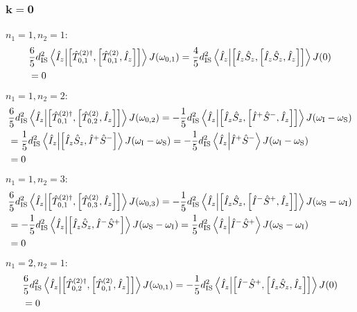 \begin{appendixtext}
\subsubsection{$\mathbf{k = 0}$}
$n_1 = 1, n_2 = 1$:
\begin{align*}
&\frac{6}{5} d_{\text{IS}}^2 \bra{\hat{I}_z} \ket{\comm{\hat{T}_{0, 1}^{(2) \dagger}}{\comm{\hat{T}_{0,1}^{(2)}}{\hat{I}_z}}} J(\omega_{0,1}) = \frac{4}{5} d_{\text{IS}}^2 \bra{\hat{I}_z} \ket{\comm{\hat{I}_z \hat{S}_z}{\comm{\hat{I}_z \hat{S}_z}{\hat{I}_z}}} J(0) \\
&= 0
\end{align*}
$n_1 = 1, n_2 = 2$:
\begin{align*}
&\frac{6}{5} d_{\text{IS}}^2 \bra{\hat{I}_z} \ket{\comm{\hat{T}_{0,1}^{(2) \dagger}}{\comm{\hat{T}_{0,2}^{(2)}}{\hat{I}_z}}} J(\omega_{0,2}) = -\frac{1}{5} d_{\text{IS}}^2 \bra{\hat{I}_z} \ket{\comm{\hat{I}_z \hat{S}_z}{\comm{\hat{I}^+ \hat{S}^-}{\hat{I}_z}}} J(\omega_{\text{I}} - \omega_{\text{S}}) \\
&= \frac{1}{5} d_{\text{IS}}^2 \bra{\hat{I}_z} \ket{\comm{\hat{I}_z \hat{S}_z}{\hat{I}^+ \hat{S}^-}} J(\omega_{\text{I}} - \omega_{\text{S}}) = -\frac{1}{5} d_{\text{IS}}^2 \bra{\hat{I}_z} \ket{\hat{I}^+ \hat{S}^-} J(\omega_{\text{I}} - \omega_{\text{S}}) \\
& = 0
\end{align*}
$n_1 = 1, n_2 = 3$:
\begin{align*}
&\frac{6}{5} d_{\text{IS}}^2 \bra{\hat{I}_z} \ket{\comm{\hat{T}_{0,1}^{(2) \dagger}}{\comm{\hat{T}_{0,3}^{(2)}}{\hat{I}_z}}} J(\omega_{0,3}) = -\frac{1}{5} d_{\text{IS}}^2 \bra{\hat{I}_z} \ket{\comm{\hat{I}_z \hat{S}_z}{\comm{\hat{I}^- \hat{S}^+}{\hat{I}_z}}} J(\omega_{\text{S}} - \omega_{\text{I}}) \\
&= -\frac{1}{5} d_{\text{IS}}^2 \bra{\hat{I}_z} \ket{\comm{\hat{I}_z \hat{S}_z}{\hat{I}^- \hat{S}^+}} J(\omega_{\text{S}} - \omega_{\text{I}}) = \frac{1}{5} d_{\text{IS}}^2 \bra{\hat{I}_z} \ket{\hat{I}^- \hat{S}^+} J(\omega_{\text{S}} - \omega_{\text{I}}) \\
&= 0
\end{align*}
$n_1 = 2, n_2 = 1$:
\begin{align*}
&\frac{6}{5} d_{\text{IS}}^2 \bra{\hat{I}_z} \ket{\comm{\hat{T}_{0,2}^{(2) \dagger}}{\comm{\hat{T}_{0,1}^{(2)}}{\hat{I}_z}}} J(\omega_{0,1}) = -\frac{1}{5} d_{\text{IS}}^2 \bra{\hat{I}_z} \ket{\comm{\hat{I}^- \hat{S}^+}{\comm{\hat{I}_z \hat{S}_z}{\hat{I}_z}}} J(0) \\
&= 0
\end{align*}

\end{appendixtext}

